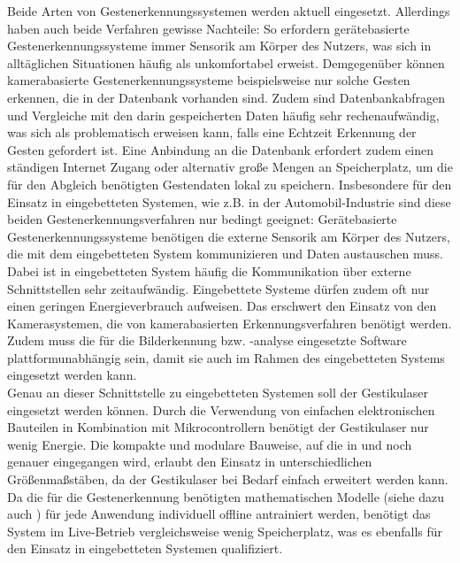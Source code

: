 Beide Arten von Gestenerkennungssystemen werden aktuell eingesetzt. Allerdings haben auch beide Verfahren gewisse Nachteile: So erfordern gerätebasierte Gestenerkennungssysteme immer Sensorik am Körper des Nutzers, was sich in alltäglichen Situationen häufig als unkomfortabel erweist. Demgegenüber können kamerabasierte Gestenerkennungssysteme beispielsweise nur solche Gesten erkennen, die in der Datenbank vorhanden sind. Zudem sind Datenbankabfragen und Vergleiche mit den darin gespeicherten Daten häufig sehr rechenaufwändig, was sich als problematisch erweisen kann, falls eine Echtzeit Erkennung der Gesten gefordert ist. Eine Anbindung an die Datenbank erfordert zudem einen ständigen Internet Zugang oder alternativ große Mengen an Speicherplatz, um die für den Abgleich benötigten Gestendaten lokal zu speichern. Insbesondere für den Einsatz in eingebetteten Systemen, wie z.B. in der Automobil-Industrie sind diese beiden Gestenerkennungsverfahren nur bedingt geeignet: Gerätebasierte Gestenerkennungssysteme benötigen die externe Sensorik am Körper des Nutzers, die mit dem eingebetteten System kommunizieren und Daten austauschen muss. Dabei ist in eingebetteten System häufig die Kommunikation über externe Schnittstellen sehr zeitaufwändig. Eingebettete Systeme dürfen zudem oft nur einen geringen Energieverbrauch aufweisen. Das erschwert den Einsatz von den Kamerasystemen, die von kamerabasierten Erkennungsverfahren benötigt werden. Zudem muss die für die Bilderkennung bzw. -analyse eingesetzte Software plattformunabhängig sein, damit sie auch im Rahmen des eingebetteten Systems eingesetzt werden kann. \\
Genau an dieser Schnittstelle zu eingebetteten Systemen soll der Gestikulaser eingesetzt werden können. Durch die Verwendung von einfachen elektronischen Bauteilen in Kombination mit Mikrocontrollern benötigt der Gestikulaser nur wenig Energie. Die kompakte und modulare Bauweise, auf die in  und  noch genauer eingegangen wird, erlaubt den Einsatz in unterschiedlichen Größenmaßstäben, da der Gestikulaser bei Bedarf einfach erweitert werden kann. Da die für die Gestenerkennung benötigten mathematischen Modelle (siehe dazu auch ) für jede Anwendung individuell offline antrainiert werden, benötigt das System im Live-Betrieb vergleichsweise wenig Speicherplatz, was es ebenfalls für den Einsatz in eingebetteten Systemen qualifiziert.